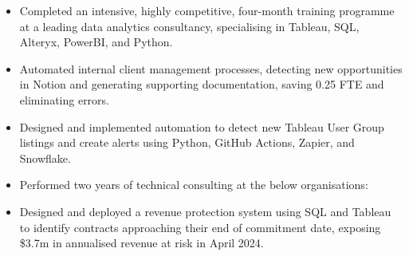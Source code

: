 \makecvname



\begin{paracol}{2}

\begin{itemize}
\item Completed an intensive, highly competitive, four-month training programme at a leading data analytics consultancy, specialising in Tableau, SQL, Alteryx, PowerBI, and Python.
\item Automated internal client management processes, detecting new opportunities in Notion and generating supporting documentation, saving 0.25 FTE and eliminating errors.
\item Designed and implemented automation to detect new Tableau User Group listings and create alerts using Python, GitHub Actions, Zapier, and Snowflake.
\item Performed two years of technical consulting at the below organisations:

\medskip
{}

\end{itemize}

\divider

\begin{itemize}
\item Designed and deployed a revenue protection system using SQL and Tableau to identify contracts approaching their end of commitment date, exposing \$3.7m in annualised revenue at risk in April 2024.


\end{itemize}
\end{paracol}
